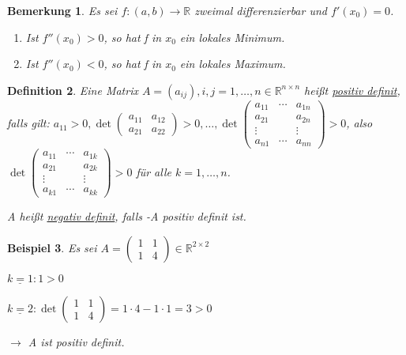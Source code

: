\documentclass[12pt,a4paper]{scrreprt}
\newtheorem{defi}{Definition}[section]
\newtheorem{bemerkung}[defi]{Bemerkung}
\newtheorem{beispiel}[defi]{Beispiel}
\begin{document}
\begin{bemerkung}
	Es sei $f:(a,b)\to\mathbb{R}$ zweimal differenzierbar und $f'(x_0)=0$.
	\begin{enumerate}[label=(\roman*)]
		\item Ist $f''(x_0)>0$, so hat f in $x_0$ ein lokales Minimum.
		\item Ist $f''(x_0)<0$, so hat f in $x_0$ ein lokales Maximum.
	\end{enumerate}
\end{bemerkung}

\begin{defi}
	Eine Matrix $A=(a_{ij}), i,j=1,\dots,n \in \mathbb{R}^{n\times n}$ heißt \underline{positiv definit}, falls gilt:
	$a_{11}>0,\det\begin{pmatrix}
	a_{11} & a_{12} \\ a_{21} & a_{22}
	\end{pmatrix} > 0, \dots, \det\begin{pmatrix}
	a_{11} & \cdots & a_{1n} \\
	a_{21} &  & a_{2n} \\
	\vdots & & \vdots \\
	a_{n1} & \cdots & a_{nn}
	\end{pmatrix} > 0$, also $\det\begin{pmatrix}
	a_{11} & \cdots & a_{1k} \\
	a_{21} &  & a_{2k} \\
	\vdots & & \vdots \\
	a_{k1} & \cdots & a_{kk}
	\end{pmatrix} > 0$ für alle $k=1,\dots,n$.
	
	A heißt \underline{negativ definit}, falls -A positiv definit ist.
\end{defi}

\begin{beispiel}
	Es sei $A=\begin{pmatrix}
	1 & 1 \\ 1 & 4
	\end{pmatrix} \in \mathbb{R}^{2\times 2}$
	
	$\underline{k=1}:1>0$
	
	$\underline{k=2}: \det\begin{pmatrix}
	1 & 1 \\ 1 & 4
	\end{pmatrix} = 1\cdot4-1\cdot1=3>0$
	
	$\to$ A ist positiv definit.
\end{beispiel}
\end{document}
